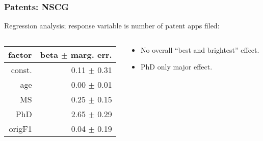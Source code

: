 \documentclass{beamer}
\begin{document}
\begin{frame}
\frametitle{Patents:  NSCG}

\pause

Regression analysis; response variable is number of patent apps filed:
\pause

\medskip

\begin{columns}

  \begin{column}{0.5\textwidth}
   \begin{tabular}{|r|r|}
   \hline
   factor & beta $\pm$ marg. err.  \\ \hline
   \hline
   const. & 0.11 {\small $\pm$ 0.31} \\ \hline
   age & 0.00 {\small $\pm$ 0.01} \\ \hline
   MS & 0.25 {\small $\pm$ 0.15} \\ \hline
   PhD & 2.65 {\small $\pm$ 0.29} \\ \hline
   origF1 & 0.04 {\small $\pm$ 0.19} \\ \hline
   \end{tabular}
  \end{column}
  
  \begin{column}{0.5\textwidth}
  \pause
  \begin{itemize}
  \item No overall ``best and brightest'' effect.
  \pause
  \item PhD only major effect.
  \end{itemize}
  \end{column}

\end{columns}

\end{frame}
\end{document}
